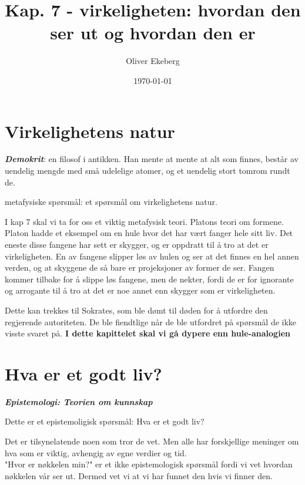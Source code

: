 \documentclass[11pt, a4paper]{article}
\title{Kap. 7 - virkeligheten: hvordan den ser ut og hvordan den er}
\author{Oliver Ekeberg}
\date{\today}
\begin{document}
\maketitle

\tableofcontents


\section{Virkelighetens natur}


\textbf{\textit{Demokrit}}: en filosof i antikken. Han mente at mente at alt som finnes, består av uendelig mengde med små udelelige atomer, og et uendelig stort tomrom rundt de.

metafysiske spørsmål: et spørsmål om virkelighetens natur.



I kap 7 skal vi ta for oss et viktig metafysisk teori. Platons teori om formene. Platon hadde et eksempel om en hule hvor det har vært fanger hele sitt liv. Det eneste disse fangene har sett er skygger, og er oppdratt til å tro at det er virkeligheten. En av fangene slipper løs av hulen og ser at det finnes en hel annen verden, og at skyggene de så bare er projeksjoner av former de ser. Fangen kommer tilbake for å slippe løs fangene, men de nekter, fordi de er for ignorante og arrogante til å tro at det er noe annet enn skygger som er virkeligheten.

Dette kan trekkes til Sokrates, som ble dømt til døden for å utfordre den regjerende autoriteten. De ble fiendtlige når de ble utfordret på spørsmål de ikke visste svaret på. \textbf{I dette kapittelet skal vi gå dypere enn hule-analogien}


\section{Hva er et godt liv?}


\textbf{\textit{Epistemologi: Teorien om kunnskap}}

Dette er et epistemoligisk spørsmål: Hva er et godt liv?

Det er tilsynelatende noen som tror de vet. Men alle har forskjellige meninger om hva som er viktig, avhengig av egne verdier og tid. \\



"Hvor er nøkkelen min?" er et ikke epistemologisk spørsmål fordi vi vet hvordan nøkkelen vår ser ut. Dermed vet vi at vi har funnet den hvis vi finner den.\\
\end{document}
